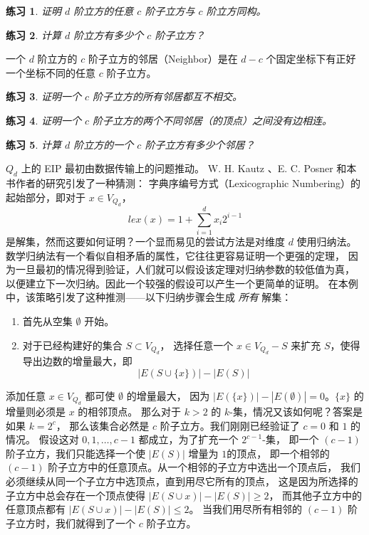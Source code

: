 \documentclass[12pt, a4paper]{article}
\newtheorem{exercise}{练习}
\begin{document}
\begin{exercise}
\label{Exercise 3}
证明 $d$ 阶立方的任意 $c$ 阶子立方与 $c$ 阶立方同构。
\end{exercise}

\begin{exercise}
\label{Exercise 4}
计算 $d$ 阶立方有多少个 $c$ 阶子立方？
\end{exercise}

一个 $d$ 阶立方的 $c$ 阶子立方的邻居（Neighbor）是在 $d − c$
个固定坐标下有正好一个坐标不同的任意 $c$ 阶子立方。

\begin{exercise}
\label{Exercise 5}
证明一个 $c$ 阶子立方的所有邻居都互不相交。
\end{exercise}

\begin{exercise}
\label{Exercise 6}
证明一个 $c$ 阶子立方的两个不同邻居（的顶点）之间没有边相连。
\end{exercise}

\begin{exercise}
\label{Exercise 7}
计算 $d$ 阶立方的一个 $c$ 阶子立方有多少个邻居？
\end{exercise}

$Q_d$ 上的 EIP 最初由数据传输上的问题推动。
W. H. Kautz \cite{Kautz.1954}、E. C. Posner 和本书作者的研究引发了一种猜测：
字典序编号方式（Lexicographic Numbering）的起始部分，即对于 $x \in V_{Q_d}$，
\begin{equation*}
lex(x) = 1 + \sum_{i = 1}^d x_i 2^{i - 1}
\end{equation*}
是解集，然而这要如何证明？一个显而易见的尝试方法是对维度 $d$ 使用归纳法。
数学归纳法有一个看似自相矛盾的属性，它往往更容易证明一个更强的定理，
因为一旦最初的情况得到验证，人们就可以假设该定理对归纳参数的较低值为真，
以便建立下一次归纳。因此一个较强的假设可以产生一个更简单的证明。
在本例中，该策略引发了这种推测——以下归纳步骤会生成 \emph{所有} 解集：

\begin{enumerate}[(1)]
	\item 首先从空集 $\emptyset$ 开始。
	\item 对于已经构建好的集合 $S \subset V_{Q_d}$，
		选择任意一个 $x \in V_{Q_d} − S$ 来扩充 $S$，使得导出边数的增量最大，即
		\begin{equation*}
		|E(S \cup \{x\})| − |E(S)|
		\end{equation*}
\end{enumerate}

添加任意 $x \in V_{Q_d}$ 都可使 $\emptyset$ 的增量最大，
因为 $|E(\{x\})| − |E(\emptyset)| = 0$。$\{x\}$ 的增量则必须是 $x$ 的相邻顶点。
那么对于 $k > 2$ 的 $k$-集，情况又该如何呢？答案是如果 $k = 2^c$，
那么该集合必然是 $c$ 阶子立方。我们刚刚已经验证了 $c = 0$ 和 $1$ 的情况。
假设这对 $0, 1, \dots, c − 1$ 都成立，为了扩充一个 $2^{c − 1}$-集，
即一个 $(c − 1)$ 阶子立方，我们只能选择一个使 $|E(S)|$ 增量为 $1 $的顶点，
即一个相邻的 $(c − 1)$ 阶子立方中的任意顶点。从一个相邻的子立方中选出一个顶点后，
我们必须继续从同一个子立方中选顶点，直到用尽它所有的顶点，
这是因为所选择的子立方中总会存在一个顶点使得 $|E(S \cup {x})| − |E(S)| \ge 2$，
而其他子立方中的任意顶点都有 $|E(S \cup {x})| − |E(S)| \le 2$。
当我们用尽所有相邻的 $(c − 1)$ 阶子立方时，我们就得到了一个 $c$ 阶子立方。
\end{document}
